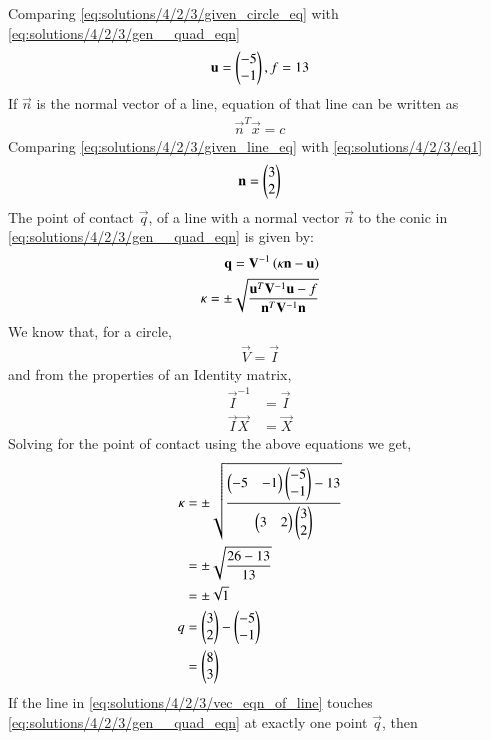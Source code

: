Comparing \eqref{eq:solutions/4/2/3/given_circle_eq} with \eqref{eq:solutions/4/2/3/gen__quad_eqn}
\begin{align}
\mathbf{u}=\begin{pmatrix}-5 \\ -1\end{pmatrix}, f=13 
\end{align}
If $\vec{n}$ is the normal vector of a line, equation of that line can be written as 
\begin{align}
\vec{n}^T\vec{x} = c \label{eq:solutions/4/2/3/eq1}
\end{align}
Comparing \eqref{eq:solutions/4/2/3/given_line_eq} with \eqref{eq:solutions/4/2/3/eq1}
\begin{align}
\mathbf{n} = \begin{pmatrix}3 \\ 2\end{pmatrix}\label{eq:solutions/4/2/3/eq2}
\end{align}
 The point of contact $\vec{q}$, of a line with a normal vector $\vec{n}$ to the conic in \eqref{eq:solutions/4/2/3/gen__quad_eqn} is given by:
\begin{align}
\mathbf{q} = \mathbf{V}^{-1}\left(\kappa \mathbf{n}-\mathbf{u}\right) 
\\
\kappa = \pm \sqrt{\frac{\mathbf{u}^T\mathbf{V}^{-1}\mathbf{u}-f}{\mathbf{n}^T\mathbf{V}^{-1}\mathbf{n}}} \label{eq:solutions/4/2/3/eq4}
\end{align}
We know that, for a circle, 
\begin{align}
\vec{V} = \vec{I}  
\end{align}
and from the properties of an Identity matrix, 
\begin{align}
\vec{I}^{-1} &= \vec{I} \\
\vec{I}\vec{X} &= \vec{X}   
\end{align}
Solving for the point of contact using the above equations we get,
\begin{align}
\kappa &= \pm \sqrt{\frac{\begin{pmatrix} -5 & -1 \end{pmatrix}\begin{pmatrix}-5 \\ -1\end{pmatrix} - 13}{\begin{pmatrix}3 & 2 \end{pmatrix}\begin{pmatrix}3 \\ 2 \end{pmatrix}}} \\
&= \pm \sqrt{\frac{26 - 13}{13}} \\
& =  \pm \sqrt{1} \\
q &= \begin{pmatrix}3 \\2 \end{pmatrix} - \begin{pmatrix}-5 \\ -1\end{pmatrix} \\
&= \begin{pmatrix}8 \\ 3\end{pmatrix}
\end{align}
If the line in \eqref{eq:solutions/4/2/3/vec_eqn_of_line} touches  \eqref{eq:solutions/4/2/3/gen__quad_eqn} at exactly one point $\vec{q}$, then 
